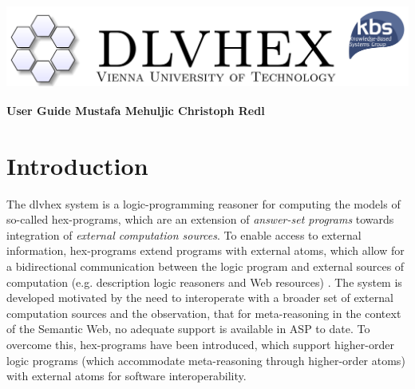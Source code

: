\documentclass[14pt,a4paper, titlepage]{article}
\begin{document}
\setcounter{page}{3}
\newcommand{\dlvhex}{{\sc dlvhex}}
\newcommand{\hex}{{\sc hex}}
\setcounter{secnumdepth}{4} %
\setcounter{tocdepth}{4}    %

\begin{titlepage}
    \centering
    \vfill
    \includegraphics[width=16cm,height=3.5cm]{biglogo_whitebg}
    \vfill
    {\bfseries\Large
        User Guide
        \vskip4cm
        Mustafa Mehuljic \vskip1cm Christoph Redl
    }    
    
\end{titlepage}

\begin{abstract}
This document provides a user guide for the Answer Set Programming (ASP) system called \dlvhex{} developed at Vienna University of Technology. ASP is a declarative problem solving paradigm, rooted in Logic programming and nonmonotonic reasoning, which has been gaining increasing attention during the last years. The \dlvhex{} system is a reasoner for computing the models of so-called \hex{}-programs, which are an extension of \emph{answer-set programs} towards integration of \emph{external computation sources}. This guide aims at enabling users of this system to interoperate with a broader set of external computation sources. The guide refers to release 2.4.     
\end{abstract}

\tableofcontents
\newpage

\section{Introduction} %
The \dlvhex{} system is a logic-programming reasoner for computing the models of so-called \hex{}-programs, which are an extension of \emph{answer-set programs} towards integration of \emph{external computation sources}. To enable access to external information, \hex{}-programs extend programs with external atoms, which allow for a bidirectional communication between the logic program and external sources of computation (e.g. description logic reasoners and Web resources) \cite{extatoms}. The system is developed motivated by the need to interoperate with a broader set of external computation sources and the observation, that for meta-reasoning in the context of the Semantic Web, no adequate support is available in ASP to date. To overcome this, \hex{}-programs have been introduced, which support higher-order logic programs (which accommodate meta-reasoning through higher-order atoms) with external atoms for software interoperability.
\end{document}
